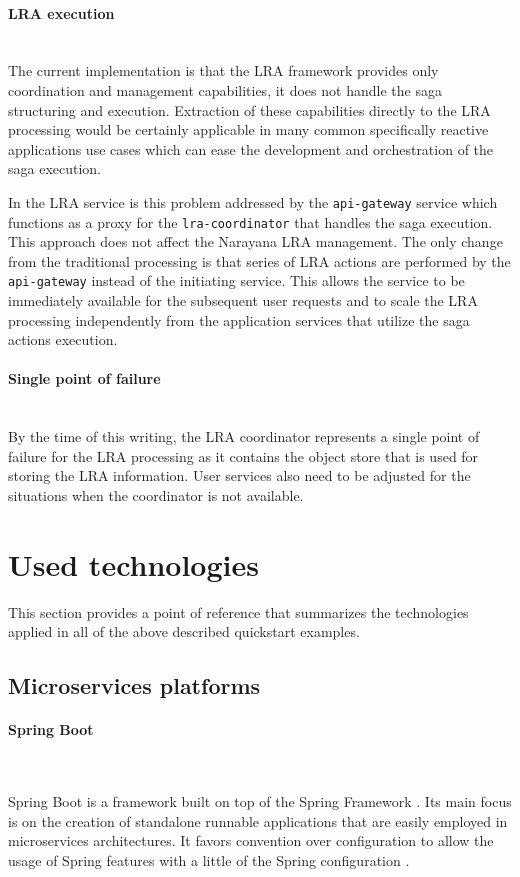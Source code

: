 \documentclass[oneside,
  digital, %
  table,   %
  lof,     %
  lot,     %
]{fithesis3}
\newcommand{\newlinepar}[1]{\paragraph{#1}\needspace{3\baselineskip}\mbox{}\\}
\begin{document}
\newlinepar{LRA execution}

The current implementation is that the LRA framework provides only coordination and management capabilities, it does not handle the saga structuring and execution. Extraction of these capabilities directly to the LRA processing would be certainly applicable in many common specifically reactive applications use cases which can ease the development and orchestration of the saga execution. 

In the LRA service is this problem addressed by the \texttt{api-gateway} service which functions as a proxy for the \texttt{lra-coordinator} that handles the saga execution. This approach does not affect the Narayana LRA management. The only change from the traditional processing is that series of LRA actions are performed by the \texttt{api-gateway} instead of the initiating service. This allows the service to be immediately available for the subsequent user requests and to scale the LRA processing independently from the application services that utilize the saga actions execution.

\newlinepar{Single point of failure}

By the time of this writing, the LRA coordinator represents a single point of failure for the LRA processing as it contains the object store that is used for storing the LRA information. User services also need to be adjusted for the situations when the coordinator is not available.


\section{Used technologies}

This section provides a point of reference that summarizes the technologies applied in all of the above described quickstart examples.

\subsection{Microservices platforms}

\newlinepar{Spring Boot}
\label{sec:spring-boot}

Spring Boot is a framework built on top of the Spring Framework \cite{spring_ms}. Its main focus is on the creation of standalone runnable applications that are easily employed in microservices architectures. It favors convention over configuration to allow the usage of Spring features with a little of the Spring configuration \cite{spring_boot}.
\end{document}
